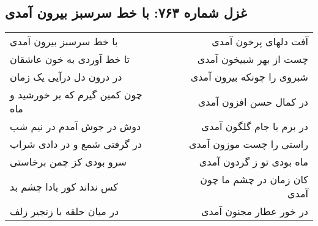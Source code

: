 \begin{center}
\section*{غزل شماره ۷۶۳: با خط سرسبز بیرون آمدی}
\label{sec:763}
\begin{longtable}{l p{0.5cm} r}
با خط سرسبز بیرون آمدی
&&
آفت دلهای پرخون آمدی
\\
تا خط آوردی به خون عاشقان
&&
چست از بهر شبیخون آمدی
\\
در درون دل درآیی یک زمان
&&
شبروی را چونکه بیرون آمدی
\\
چون کمین گیرم که بر خورشید و ماه
&&
در کمال حسن افزون آمدی
\\
دوش در جوش آمدم در نیم شب
&&
در برم با جام گلگون آمدی
\\
در گرفتی شمع و در دادی شراب
&&
راستی را چست موزون آمدی
\\
سرو بودی کز چمن برخاستی
&&
ماه بودی تو ز گردون آمدی
\\
کس نداند کور بادا چشم بد
&&
کان زمان در چشم ما چون آمدی
\\
در میان حلقه با زنجیر زلف
&&
در خور عطار مجنون آمدی
\\
\end{longtable}
\end{center}
